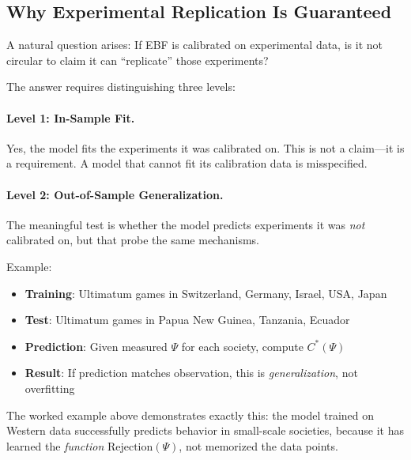 
\subsection{Why Experimental Replication Is Guaranteed}
\label{sec:ch4x-replication}

A natural question arises: If EBF is calibrated on experimental data,
is it not circular to claim it can ``replicate'' those experiments?

The answer requires distinguishing three levels:

\paragraph{Level 1: In-Sample Fit.}
Yes, the model fits the experiments it was calibrated on. This is not a
claim---it is a requirement. A model that cannot fit its calibration data
is misspecified.

\paragraph{Level 2: Out-of-Sample Generalization.}
The meaningful test is whether the model predicts experiments it was
\emph{not} calibrated on, but that probe the same mechanisms.

Example:
\begin{itemize}
    \item \textbf{Training}: Ultimatum games in Switzerland, Germany, Israel, USA, Japan
    \item \textbf{Test}: Ultimatum games in Papua New Guinea, Tanzania, Ecuador
    \item \textbf{Prediction}: Given measured $\Psi$ for each society, compute
          $C^*(\Psi)$
    \item \textbf{Result}: If prediction matches observation, this is
          \emph{generalization}, not overfitting
\end{itemize}

The worked example above demonstrates exactly this: the model trained on
Western data successfully predicts behavior in small-scale societies, because
it has learned the \emph{function} $\text{Rejection}(\Psi)$, not memorized
the data points.

